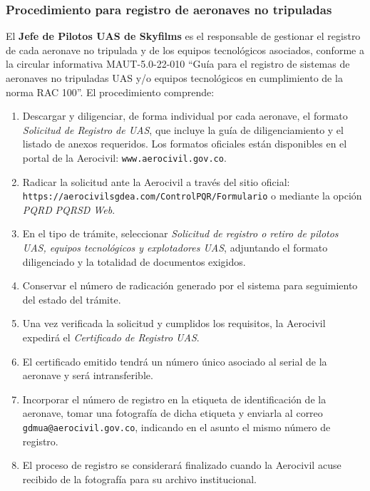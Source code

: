 \subsubsection{Procedimiento para registro de aeronaves no tripuladas}

El \textbf{Jefe de Pilotos UAS de Skyfilms} es el responsable de gestionar el registro de cada aeronave no tripulada y de los equipos tecnológicos asociados, conforme a la circular informativa MAUT-5.0-22-010 “Guía para el registro de sistemas de aeronaves no tripuladas UAS y/o equipos tecnológicos en cumplimiento de la norma RAC 100”. El procedimiento comprende:

\begin{enumerate}
    \item Descargar y diligenciar, de forma individual por cada aeronave, el formato \textit{Solicitud de Registro de UAS}, que incluye la guía de diligenciamiento y el listado de anexos requeridos. Los formatos oficiales están disponibles en el portal de la Aerocivil: \texttt{www.aerocivil.gov.co}.
    \item Radicar la solicitud ante la Aerocivil a través del sitio oficial: 
    \\ \texttt{https://aerocivilsgdea.com/ControlPQR/Formulario} o mediante la opción \textit{PQRD} \textrightarrow{} \textit{PQRSD Web}.
    \item En el tipo de trámite, seleccionar \textit{Solicitud de registro o retiro de pilotos UAS, equipos tecnológicos y explotadores UAS}, adjuntando el formato diligenciado y la totalidad de documentos exigidos.
    \item Conservar el número de radicación generado por el sistema para seguimiento del estado del trámite.
    \item Una vez verificada la solicitud y cumplidos los requisitos, la Aerocivil expedirá el \textit{Certificado de Registro UAS}.
    \item El certificado emitido tendrá un número único asociado al serial de la aeronave y será intransferible.
    \item Incorporar el número de registro en la etiqueta de identificación de la aeronave, tomar una fotografía de dicha etiqueta y enviarla al correo \texttt{gdmua@aerocivil.gov.co}, indicando en el asunto el mismo número de registro.
    \item El proceso de registro se considerará finalizado cuando la Aerocivil acuse recibido de la fotografía para su archivo institucional.
\end{enumerate}

